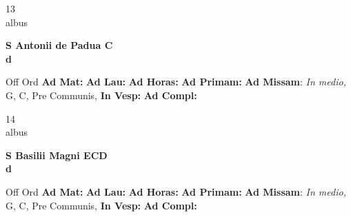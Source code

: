 \documentclass[10pt, openany]{book}
\begin{document}
    \begin{center}
        \begin{minipage}{3.5in}
            \vspace{2em}
            \begin{minipage}{0.5in}
                {\Huge 13} \\
                {\normalsize albus}
            \end{minipage}
            \begin{minipage}{3.0in}
                \textbf{ \large S Antonii de Padua C \\
                \textnormal{\normalsize d}}

            \end{minipage}
            \begin{justify}Off Ord
                \textbf{Ad Mat: }
                \textbf{Ad Lau: }
                \textbf{Ad Horas: }
                \textbf{Ad Primam: }\textbf{Ad Missam}: \textit{In medio,} G, C, Pre Communis, 
                \textbf{In Vesp: }
                \textbf{Ad Compl: }
            \end{justify}
        \end{minipage}
    \end{center}

    \begin{center}
        \begin{minipage}{3.5in}
            \vspace{2em}
            \begin{minipage}{0.5in}
                {\Huge 14} \\
                {\normalsize albus}
            \end{minipage}
            \begin{minipage}{3.0in}
                \textbf{ \large S Basilii Magni ECD \\
                \textnormal{\normalsize d}}

            \end{minipage}
            \begin{justify}Off Ord
                \textbf{Ad Mat: }
                \textbf{Ad Lau: }
                \textbf{Ad Horas: }
                \textbf{Ad Primam: }\textbf{Ad Missam}: \textit{In medio,} G, C, Pre Communis, 
                \textbf{In Vesp: }
                \textbf{Ad Compl: }
            \end{justify}
        \end{minipage}
    \end{center}
\end{document}
